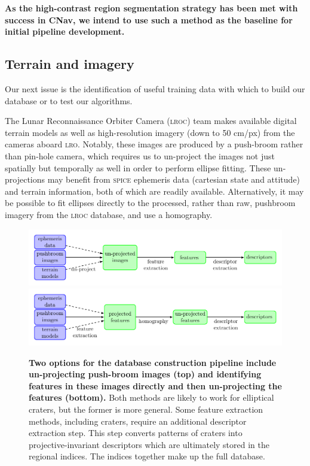 \documentclass[12pt]{olfmemo}
\begin{document}
\textbf{As the high-contrast region segmentation strategy has been met with success in CNav, we intend to use such a method as the baseline for initial pipeline development.}

\subsection{Terrain and imagery}
Our next issue is the identification of useful training data with which to build our database or to test our algorithms.

The Lunar Reconnaissance Orbiter Camera (\textsc{lroc}) team makes available digital terrain models as well as high-resolution imagery (down to 50 cm/px) from the cameras aboard \textsc{lro}. Notably, these images are produced by a push-broom rather than pin-hole camera, which requires us to un-project the images not just spatially but temporally as well \citep{Gupta1997} in order to perform ellipse fitting. These un-projections may benefit from \textsc{spice} ephemeris data (cartesian state and attitude) and terrain information, both of which are readily available. Alternatively, it may be possible to fit ellipses directly to the processed, rather than raw, pushbroom imagery from the \textsc{lroc} database, and use a homography.

\begin{figure}
\includegraphics[width=\textwidth]{pipeline.pdf}
\includegraphics[width=\textwidth]{pipeline2.pdf}
\caption{\label{fig:pipeline}\textbf{Two options for the database construction pipeline include un-projecting push-broom images (top) and identifying features in these images directly and then un-projecting the features (bottom).} Both methods are likely to work for elliptical craters, but the former is more general. Some feature extraction methods, including craters, require an additional descriptor extraction step. This step converts patterns of craters into projective-invariant descriptors which are ultimately stored in the regional indices. The indices together make up the full database.}
\end{figure}
\end{document}
